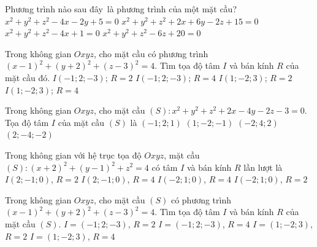 \begin{ex}%
	Phương trình nào sau đây~là phương trình của một mặt cầu? 
	 \choice
		{$x^2+y^2+z^2-4  x-2 y+5=0$}
		{$x^2+y^2+z^2+2 x+6  y-2 z+15=0$}
		 {\True $x^2+y^2+z^2-4 x+1=0$}
		{$x^2+y^2+z^2-6 z+20=0$} 
\end{ex}

\begin{ex}%
	Trong không  gian $Oxyz$, cho mặt cầu có phương trình $(x-1)^2+(y+2)^2+(z-3)^2=4$. Tìm tọa độ tâm $I$ và bán kính $R$ của mặt cầu đó.
	 \choice
		{$I(-1;  2;-3)$; $R=2$}
		{$I(-1; 2;-3)$; $R=4$} 
		{\True $I(1;-2; 3)$;  $R=2$}
		{$I(1;-2;  3)$; $R=4$}
\end{ex}

\begin{ex}%
	Trong không gian $Oxyz$, cho mặt cầu $(S)\colon x^2+y^2+z^2+2x-4y-2z-3=0$. Tọa độ tâm  $I$ của mặt cầu $(S)$ là
	\choice 
		 {\True$(-1;2;1)$}
		{$(1;-2;-1)$} 
		 {$(-2;4;2)$}
		 {$(2;-4;-2)$}
\end{ex}

\begin{ex}%
	Trong không gian với hệ trục tọa độ $Oxyz$, mặt cầu $(S)\colon(x+2)^2+(y-1)^2+z^2=4$ có tâm $I$ và bán kính $R$  lần lượt là
	 \choice
		{$I(2;-1; 0)$, $R=2$} 
		{$I(2;-1;  0)$, $R=4$}
		{$I(-2; 1; 0)$, $R=4$} 
		{\True  $I(-2; 1; 0)$, $R=2$}
\end{ex}

\begin{ex}%
	Trong không gian $Oxyz$, cho  mặt cầu $(S)$ có phương trình $(x-1)^2+(y+2)^2+(z-3)^2=4$. Tìm tọa độ tâm $I$ và bán kính $R$ của mặt cầu $(S)$.
	\choice 
		{$I=(-1;2;-3)$,  $R=2$}
		{$I=(-1;2;-3)$,  $R=4$}
		{\True  $I=(1;-2;3)$, $R=2$}
		 {$I=(1;-2;3)$, $R=4$}
\end{ex}

